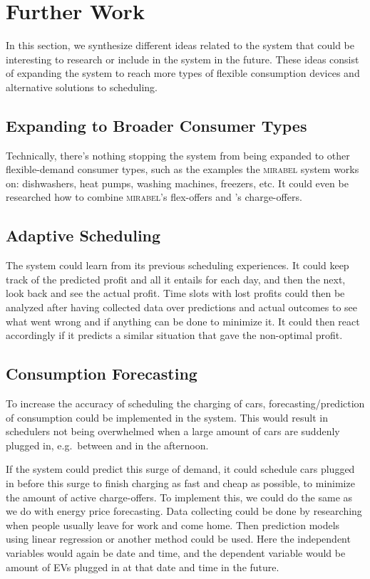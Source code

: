\section{Further Work}\label{sec:furtherwork}
In this section, we synthesize different ideas related to the system that could be interesting to research or include in the system in the future. These ideas consist of expanding the system to reach more types of flexible consumption devices and alternative solutions to scheduling.

\subsection{Expanding to Broader Consumer Types}
Technically, there's nothing stopping the system from being expanded to other flexible-demand consumer types, such as the examples the \textsc{mirabel} system works on: dishwashers, heat pumps, washing machines, freezers, etc. It could even be researched how to combine \textsc{mirabel}'s flex-offers and \productname's charge-offers.

\subsection{Adaptive Scheduling}
The system could learn from its previous scheduling experiences. It could keep track of the predicted profit and all it entails for each day, and then the next, look back and see the actual profit. Time slots with lost profits could then be analyzed after having collected data over predictions and actual outcomes to see what went wrong and if anything can be done to minimize it. It could then react accordingly if it predicts a similar situation that gave the non-optimal profit.

\subsection{Consumption Forecasting}
To increase the accuracy of scheduling the charging of cars, forecasting/prediction of consumption could be implemented in the system. This would result in schedulers not being overwhelmed when a large amount of cars are suddenly plugged in, e.g.\ between  and  in the afternoon.

If the system could predict this surge of demand, it could schedule cars plugged in before this surge to finish charging as fast and cheap as possible, to minimize the amount of active charge-offers. To implement this, we could do the same as we do with energy price forecasting. Data collecting could be done by researching when people usually leave for work and come home. Then prediction models using linear regression or another method could be used. Here the independent variables would again be date and time, and the dependent variable would be amount of EVs plugged in at that date and time in the future.

